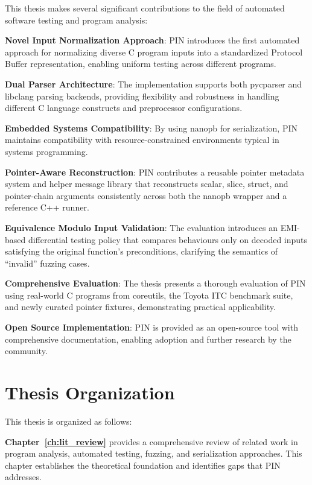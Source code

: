 \documentclass[doublespace,nopageskip]{VTthesis} %
\begin{document}
	This thesis makes several significant contributions to the field of automated software testing and program analysis:
	
	\textbf{Novel Input Normalization Approach}: PIN introduces the first automated approach for normalizing diverse C program inputs into a standardized Protocol Buffer representation, enabling uniform testing across different programs.
	
	\textbf{Dual Parser Architecture}: The implementation supports both pycparser and libclang parsing backends, providing flexibility and robustness in handling different C language constructs and preprocessor configurations.
	
\textbf{Embedded Systems Compatibility}: By using nanopb for serialization, PIN maintains compatibility with resource-constrained environments typical in systems programming.

\textbf{Pointer-Aware Reconstruction}: PIN contributes a reusable pointer metadata system and helper message library that reconstructs scalar, slice, struct, and pointer-chain arguments consistently across both the nanopb wrapper and a reference C++ runner.

\textbf{Equivalence Modulo Input Validation}: The evaluation introduces an EMI-based differential testing policy that compares behaviours only on decoded inputs satisfying the original function's preconditions, clarifying the semantics of ``invalid'' fuzzing cases.

\textbf{Comprehensive Evaluation}: The thesis presents a thorough evaluation of PIN using real-world C programs from coreutils, the Toyota ITC benchmark suite, and newly curated pointer fixtures, demonstrating practical applicability.
	
	\textbf{Open Source Implementation}: PIN is provided as an open-source tool with comprehensive documentation, enabling adoption and further research by the community.
	
	\section{Thesis Organization} \label{se:thesis_organization}
	
	This thesis is organized as follows:
	
	\textbf{Chapter~\ref{ch:lit_review}} provides a comprehensive review of related work in program analysis, automated testing, fuzzing, and serialization approaches. This chapter establishes the theoretical foundation and identifies gaps that PIN addresses.
	
\end{document}
